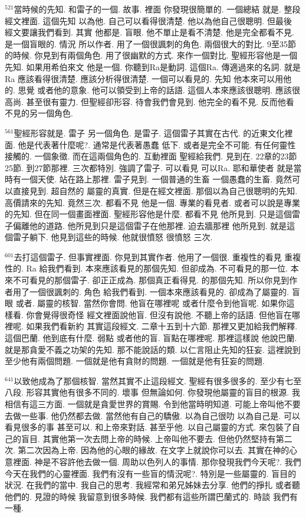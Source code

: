 \documentclass{book}
\begin{document}
$^{521}$當時候的先知.
和雷子的一個.
故事.
裡面 你發現很簡單的.
一個總結 就是.
整段經文裡面.
這個先知 以為他.
自己可以看得很清楚.
他以為他自己很聰明.
但最後 經文要讓我們看到.
其實 他都是.
盲眼.
他不單止是看不清楚.
他是完全都看不見.
是一個盲眼的.
情況 所以作者.
用了一個很諷刺的角色.
兩個很大的對比.
9至35節的時候.
你見到有兩個角色.
用了很幽默的方式.
來作一個對比.
聖經形容他是一個先知.
如果用希伯來文 他是一個.
你聽到Ra是動詞.
這個Ra.
傳適過來的名詞.
就是Ra 應該看得很清楚.
應該分析得很清楚.
一個可以看見的.
先知 他本來可以用他的.
思覺 或者他的意象.
他可以領受到上帝的話語.
這個人本來應該很聰明.
應該很高尚.
甚至很有靈力.
但聖經卻形容.
待會我們會見到.
他完全的看不見.
反而他看不見的另一個角色.

$^{561}$聖經形容就是.
雷子 另一個角色.
是雷子.
這個雷子其實在古代.
的近東文化裡面.
他是代表著什麼呢?.
通常是代表著愚蠢 低下.
或者是完全不可能.
有任何靈性接觸的.
一個象徵.
而在這兩個角色的.
互動裡面 聖經給我們.
見到在.
22章的23節 25節.
到27節那裡.
三次都特別.
強調了雷子.
可以看見 可以Ra.
耶和華使者 就是當時有一個天使.
站在路上那裡.
雷子見到.
一個普通的生畜 一個愚蠢的生畜.
竟然可以直接見到.
超自然的 屬靈的真實.
但是在經文裡面.
那個以為自己很聰明的先知.
高價請來的先知.
竟然三次.
都看不見 他是一個.
專業的看見者.
或者可以說是專業的先知.
但在同一個畫面裡面.
聖經形容他是什麼.
都看不見 他所見到.
只是這個雷子偏離他的道路.
他所見到只是這個雷子在他那裡.
迫去牆那裡 他所見到.
就是這個雷子躺下.
他見到這些的時候.
他就很憤怒 很憤怒 三次.

$^{601}$去打這個雷子.
但事實裡面.
你見到其實作者.
他用了一個很.
重複性的看見 重複性的.
Ra 給我們看到.
本來應該看見的那個先知.
但卻成為.
不可看見的那一位.
本來不可看見的那個雷子.
卻正正成為.
那個真正看得見.
的那個先知.
所以你見到作者用了一個很諷刺的.
角色 給我們看到.
一個本來應該看見的.
卻成為了屬靈的.
盲眼 或者.
屬靈的核智.
當然你會問.
他盲在哪裡呢 或者什麼令到他盲呢.
如果你這樣看.
你會覺得很奇怪 經文裡面說他盲.
但沒有說他.
不聽上帝的話語.
但他盲在哪裡呢.
如果我們看新約 其實這段經文.
二章十五到十六節.
那裡又更加給我們解釋.
這個巴蘭.
他到底有什麼.
弱點 或者他的盲.
盲點在哪裡呢.
那裡這樣說 他說巴蘭.
就是那貪愛不義之功架的先知.
那不能說話的類.
以仁言阻止先知的狂妄.
這裡說到至少他有兩個問題.
一個就是他有貪財的問題.
一個就是他有狂妄的問題.

$^{641}$以致他成為了那個核智.
當然其實不止這段經文.
聖經有很多很多的.
至少有七至八段.
形容其實他有很多不同的.
壞事 但無論如何.
你發現他屬靈的盲目的根源.
我相信有這三方面.
一個就是貪愛世界的賞賜.
令到他當時明知道.
可能上帝叫他不要去做一些事.
他仍然都去做.
當然他有自己的驕傲.
以為自己很叻 以為自己是.
可以看見很多的事 甚至可以.
和上帝來對話.
甚至乎他.
以自己屬靈的方式.
來包裝了自己的盲目.
其實他第一次去問上帝的時候.
上帝叫他不要去.
但他仍然堅持有第二次.
第二次因為上帝.
因為他的心眼的緣故.
在文字上就說你可以去.
其實在神的心意裡面.
神是不容許他去做一個.
周助以色列人的事情.
那你發現我們今天呢?.
我們今天在我們的心靈裡面.
我們有沒有一些盲的情況呢?.
特別是一些屬靈的.
盲目的狀況.
在我們的當中.
我自己的思考.
我經常和弟兄姊妹去分享.
他們的掙扎 或者聽他們的.
見證的時候 我留意到很多時候.
我們都有這些所謂巴蘭式的.
時談 我們有一種.
\end{document}
